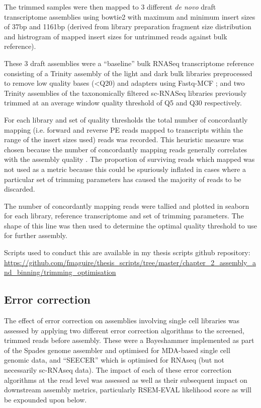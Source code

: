 The trimmed samples were then mapped to 3 different \textit{de novo} draft transcriptome assemblies using bowtie2
\citep{Langmead2012} with maximum and minimum insert sizes of 37bp and 1161bp (derived from library preparation
fragment size distribution and histrogram of mapped insert sizes for untrimmed reads against bulk reference).

These 3 draft assemblies were a ``baseline'' bulk RNASeq transcriptome reference consisting of a Trinity \citep{Haas2013} assembly of the light and dark
bulk libraries preprocessed to remove low quality bases (<Q20) and adapters using Fastq-MCF \citep{Aronesty2013};
and two Trinity assemblies of the taxonomically filtered sc-RNASeq libraries previously trimmed 
    at an average window quality threshold of Q5 and Q30 respectively.


For each library and set of quality thresholds the total number of concordantly
mapping (i.e. forward and reverse PE reads mapped to transcripts within the range of the insert sizes used)
reads was recorded.  This heuristic measure was chosen because the number of concordantly mapping reads generally correlates
with the assembly quality \citep{Macmanes2014}. The proportion of surviving reads which mapped 
was not used as a metric because this could be spuriously inflated in cases where a particular
set of trimming parameters has caused the majority of reads to be discarded.

The number of concordantly mapping reads were tallied and plotted in seaborn 
for each library, reference transcriptome and set of trimming parameters.
The shape of this line was then used to determine the optimal quality 
threshold to use for further assembly.

Scripts used to conduct this are available in my thesis scripts github repository:
\url{https://github.com/fmaguire/thesis_scripts/tree/master/chapter_2_assembly_and_binning/trimming_optimisation}


\subsection{Error correction}

The effect of error correction on assemblies involving single cell libraries was assessed 
by applying two different error correction algorithms to the screened, trimmed reads before assembly.
These were a Bayeshammer \citep{Nikolenko2013} implemented as part of the Spades 
genome assembler \citep{Bankevich2012} and optimised for MDA-based single cell genomic data, 
and ``SEECER'' \citep{Le2013} which is optimised for RNAseq (but not necessarily sc-RNAseq
data). 
The impact of each of these error correction algorithms at the read level was assessed as well 
as their subsequent impact on downstream assembly metrics, particularly RSEM-EVAL likelihood score
as will be expounded upon below.


